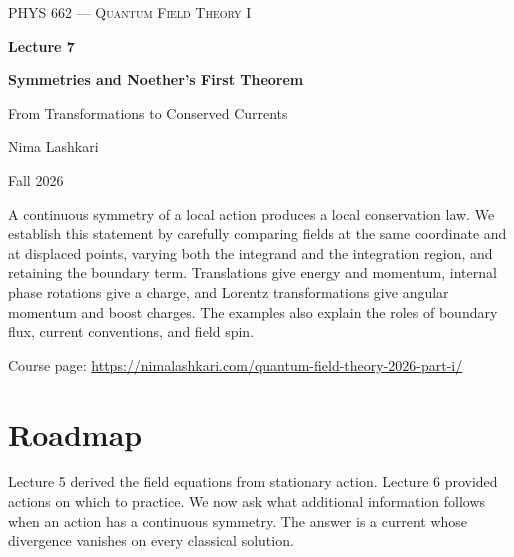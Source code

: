 \documentclass[11pt]{article}
\begin{document}
\begin{titlepage}
\centering
\vspace*{1.2in}
{\scshape\Large PHYS 662 --- Quantum Field Theory I\par}
\vspace{0.35in}
{\Huge\bfseries\color{qftblue} Lecture 7\par}
\vspace{0.15in}
{\LARGE\bfseries Symmetries and Noether's First Theorem\par}
\vspace{0.12in}
{\Large\color{qftgreen} From Transformations to Conserved Currents\par}
\vspace{0.6in}
{\large Nima Lashkari\par}
{\large Fall 2026\par}
\vfill
\begin{minipage}{0.86\textwidth}
\small
A continuous symmetry of a local action produces a local conservation law.
We establish this statement by carefully comparing fields at the same
coordinate and at displaced points, varying both the integrand and the
integration region, and retaining the boundary term. Translations give
energy and momentum, internal phase rotations give a charge, and Lorentz
transformations give angular momentum and boost charges. The examples also
explain the roles of boundary flux, current conventions, and field spin.

\medskip
Course page: \url{https://nimalashkari.com/quantum-field-theory-2026-part-i/}
\end{minipage}
\vspace{0.5in}
\end{titlepage}
\tableofcontents
\newpage
{}

\section*{Roadmap}
Lecture 5 derived the field equations from stationary action. Lecture 6
provided actions on which to practice. We now ask what additional
information follows when an action has a continuous symmetry. The answer
is a current whose divergence vanishes on every classical solution.

\end{document}
